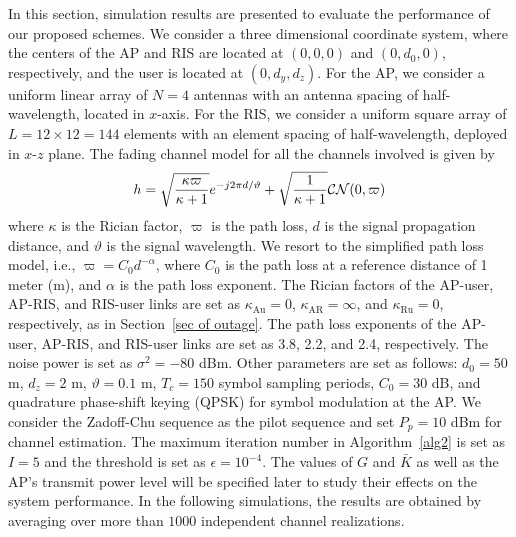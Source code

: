 \documentclass[draftclsnofoot,onecolumn,12pt]{IEEEtran}
\newcommand{\revh}[1]{{\color{black}#1}} %
\newcommand{\revh}[1]{#1}
\begin{document}
In this section, simulation results are presented to evaluate the performance of our proposed schemes. 
We consider a three dimensional coordinate system, 
where the centers of the AP and RIS are located at $(0,0,0)$ and $(0,d_0,0)$, respectively, and the user is located at $(0,d_y,d_z)$. For the AP, we consider a uniform linear array of $N=4$ antennas with an antenna spacing of half-wavelength, located in $x$-axis. For the RIS, we consider a uniform square array of $L=12\times 12=144$ elements with an element spacing of half-wavelength, deployed in $x$-$z$ plane. 
The fading channel model for all the channels involved is given by
\begin{align}
h=\sqrt{\frac{\kappa\varpi}{\kappa+1}} e^{-j2\pi{d}/{\vartheta}}+\sqrt{\frac{1}{\kappa+1}}\mathcal{CN}( { 0},\varpi)\notag
\end{align}
where $\kappa$ is the Rician factor, $\varpi$ is the path loss, $d$ is the signal propagation distance, and $\vartheta$ is the signal wavelength. We resort to the simplified path loss model, i.e., $\varpi=C_0 d^{-\alpha}$, where $C_0$ is the path loss at a reference distance of 1 meter (m), and $\alpha$ is the path loss exponent. 
\revh{The Rician factors of the AP-user, AP-RIS, and RIS-user links are set as $\kappa_\text{Au}=0$, $\kappa_\text{AR}=\infty$, and $\kappa_\text{Ru}=0$, respectively, as in Section~\ref{sec of outage}. 
The path loss exponents of the AP-user, AP-RIS, and RIS-user links are set as 3.8, 2.2, and 2.4, respectively. The noise power is set as $\sigma^2=-80$ dBm.} 
Other parameters are set as follows: $d_0=50$ m, $d_z=2$ m, $\vartheta=0.1$ m, \revh{$T_c=150$ symbol sampling periods,} $C_0=30$ dB, and quadrature phase-shift keying (QPSK) for symbol modulation at the AP. We consider the Zadoff-Chu sequence as the pilot sequence and set $P_p = 10$ dBm for channel estimation. 
The maximum iteration number in Algorithm~\ref{alg2} is set as $I=5$ \revh{and the threshold is set as $\epsilon=10^{-4}$. 
The values of $G$ and ${\bar K}$ as well as the AP's transmit power level will be specified later to study their effects on the system performance.} 
In the following simulations, the results are obtained by averaging over more than $1000$ independent channel realizations.
\end{document}
